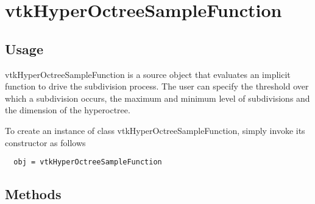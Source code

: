 \section{vtkHyperOctreeSampleFunction}

\subsection{Usage}

 vtkHyperOctreeSampleFunction is a source object that evaluates an implicit
 function to drive the subdivision process. The user can specify
 the threshold over which a subdivision occurs, the maximum and minimum
 level of subdivisions and the dimension of the hyperoctree.


To create an instance of class vtkHyperOctreeSampleFunction, simply
invoke its constructor as follows
\begin{verbatim}
  obj = vtkHyperOctreeSampleFunction
\end{verbatim}
\subsection{Methods}

